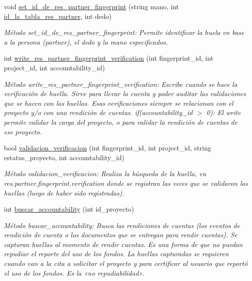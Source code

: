 \begin{DoxyCompactItemize}
void \hyperlink{classestado__proyecto_a9bb10a2ce0824b9f63b72736012285bf}{set\+\_\+id\+\_\+de\+\_\+res\+\_\+partner\+\_\+fingerprint} (string mano, int \hyperlink{classestado__proyecto_a1545134dd661b72333b06cfc9c11ae49}{id\+\_\+la\+\_\+tabla\+\_\+res\+\_\+partner}, int dedo)
\begin{DoxyCompactList}\small\item\em Método set\+\_\+id\+\_\+de\+\_\+res\+\_\+partner\+\_\+fingerprint\+: Permite identificar la huela en base a la persona (partner), el dedo y la mano especificados. \end{DoxyCompactList}\item 
int \hyperlink{classestado__proyecto_a1fe9a0efbba448d2480c9b58b38463c9}{write\+\_\+res\+\_\+partner\+\_\+fingerprint\+\_\+verification} (int fingerprint\+\_\+id, int project\+\_\+id, int accountability\+\_\+id)
\begin{DoxyCompactList}\small\item\em Método write\+\_\+res\+\_\+partner\+\_\+fingerprint\+\_\+verification\+: Escribe cuando se hace la verificación de huella. Sirve para llevar la cuenta y poder auditar las validaciones que se hacen con las huellas. Esas verificaciones siempre se relacionan con el proyecto y/o con una rendición de cuentas. if(accountability\+\_\+id $>$ 0)\+: El write permite validar la carga del proyecto, o para validar la rendición de cuentas de ese proyecto. \end{DoxyCompactList}\item 
bool \hyperlink{classestado__proyecto_a74f54f504416b6febb66b9a8fac7c4a7}{validacion\+\_\+verificacion} (int fingerprint\+\_\+id, int project\+\_\+id, string estatus\+\_\+proyecto, int accountability\+\_\+id)
\begin{DoxyCompactList}\small\item\em Método validacion\+\_\+verificacion\+: Realiza la búsqueda de la huella, en res.\+partner.\+fingerprint.\+verification donde se registran las veces que se validaron las huellas (luego de haber sido registradas). \end{DoxyCompactList}\item 
int \hyperlink{classestado__proyecto_a3029c517ed772189246c0469e58f6012}{buscar\+\_\+accountability} (int id\+\_\+proyecto)
\begin{DoxyCompactList}\small\item\em Método buscar\+\_\+accountability\+: Busca las rendiciones de cuentas (los eventos de rendición de cuenta o los documentos que se entregan para rendir cuentas). Se capturan huellas al momento de rendir cuentas. Es una forma de que no puedan repudiar el reporte del uso de los fondos. La huellas capturadas se requieren cuando van a la cita a solicitar el proyecto y para certificar al usuario que reportó el uso de los fondos. Es la «no repudiabilidad». \end{DoxyCompactList}\item 

\end{DoxyCompactItemize}
